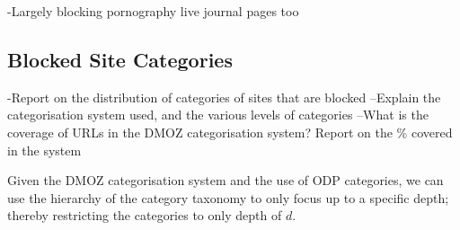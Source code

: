 \documentclass{bmcart}
\begin{document}
-Largely blocking pornography live journal pages too



\subsection*{Blocked Site Categories}
-Report on the distribution of categories of sites that are blocked
--Explain the categorisation system used, and the various levels of categories
--What is the coverage of URLs in the DMOZ categorisation system? Report on the \% covered in the system

Given the DMOZ categorisation system and the use of ODP categories, we can use the hierarchy of the category taxonomy to only focus up to a specific depth; thereby restricting the categories to only depth of $d$.
\end{document}
